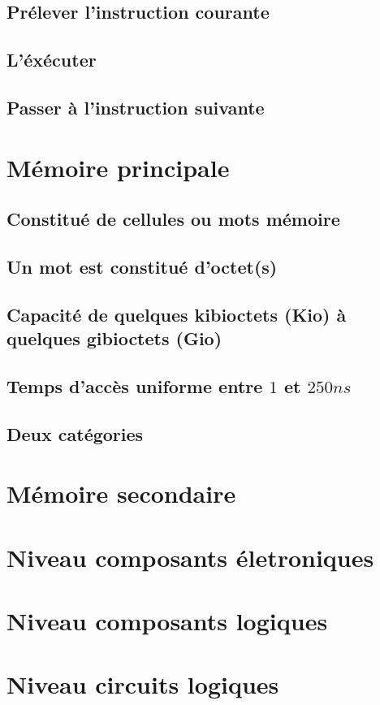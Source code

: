 		\subsection{Prélever l'instruction courante}
		\subsection{L'éxécuter}
		\subsection{Passer à l'instruction suivante}
	\section{Mémoire principale}
		\subsection{Constitué de cellules ou mots mémoire}
		\subsection{Un mot est constitué d'octet(s)}
		\subsection{Capacité de quelques kibioctets (Kio) à quelques gibioctets (Gio)}
		\subsection{Temps d'accès uniforme entre $1$ et $250 ns$}
		\subsection{Deux catégories}
	\section{Mémoire secondaire}
	\section{Niveau composants életroniques}
	\section{Niveau composants logiques}
	\section{Niveau circuits logiques}

